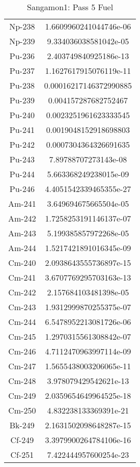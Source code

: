 \begin{table}[h!]
\begin{tabular}{|| c || c |}
Np-238 & 1.6609960241044746e-06 \\
Np-239 & 9.334036038581042e-05 \\
Pu-236 & 2.403749840925186e-13 \\
Pu-237 & 1.1627617915076119e-11 \\
Pu-238 & 0.00016217146372990885 \\
Pu-239 & 0.004157287682752467 \\
Pu-240 & 0.0023251961623333545 \\
Pu-241 & 0.0019048152918698803 \\
Pu-242 & 0.0007304364326691635 \\
Pu-243 & 7.89788707273143e-08 \\
Pu-244 & 5.663368249238015e-09 \\
Pu-246 & 4.4051542339465355e-27 \\
Am-241 & 3.649694675665504e-05 \\
Am-242 & 1.7258253191146137e-07 \\
Am-243 & 5.199385857972268e-05 \\
Am-244 & 1.5217421891016345e-09 \\
Cm-240 & 2.0938643555736897e-15 \\
Cm-241 & 3.6707769295703163e-13 \\
Cm-242 & 2.157684103481398e-05 \\
Cm-243 & 1.9312999870255375e-07 \\
Cm-244 & 6.5478952213081726e-06 \\
Cm-245 & 1.2970315561308842e-07 \\
Cm-246 & 4.7112470963997114e-09 \\
Cm-247 & 1.5655438003206065e-11 \\
Cm-248 & 3.978079429542621e-13 \\
Cm-249 & 2.0359654649964525e-18 \\
Cm-250 & 4.832238133369391e-21 \\
Bk-249 & 2.1631502098648287e-15 \\
Cf-249 & 3.3979900264784106e-16 \\
Cf-251 & 7.422444957600254e-23 \\

\hline
\end{tabular}
\caption{Sangamon1: Pass 5 Fuel}
\label{table:sang1p5fuel}
\end{table}